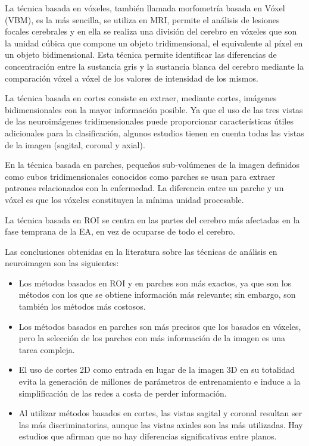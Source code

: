 La técnica basada en vóxeles, también llamada morfometría basada en Vóxel (VBM), es la más sencilla, se utiliza en MRI,
permite el análisis de lesiones focales cerebrales y en ella se realiza una división del cerebro en vóxeles que son la
unidad cúbica que compone un objeto tridimensional, el equivalente al píxel en un objeto bidimensional.
Esta técnica permite identificar las diferencias de concentración entre la sustancia gris y la sustancia blanca del
cerebro mediante la comparación vóxel a vóxel de los valores de intensidad de los mismos.

La técnica basada en cortes consiste en extraer, mediante cortes, imágenes bidimensionales con la mayor información
posible.
Ya que el uso de las tres vistas de las neuroimágenes tridimensionales puede proporcionar características
útiles adicionales para la clasificación, algunos estudios tienen en cuenta todas las vistas de la imagen (sagital,
coronal y axial).

En la técnica basada en parches, pequeños sub-volúmenes de la imagen definidos como cubos tridimensionales conocidos
como parches se usan para extraer patrones relacionados con la enfermedad.
La diferencia entre un parche y un vóxel es que los vóxeles constituyen la mínima unidad procesable.

La técnica basada en ROI se centra en las partes del cerebro más afectadas en la fase temprana de la EA, en vez de
ocuparse de todo el cerebro.

Las conclusiones obtenidas en la literatura sobre las técnicas de análisis en neuroimagen son las siguientes:
\begin{itemize}
    \item Los métodos basados en ROI y en parches son más exactos, ya que son los métodos con los que se obtiene
    información más relevante;
    sin embargo, son también los métodos más costosos.
    \item Los métodos basados en parches son más precisos que los basados en vóxeles, pero la selección de los parches
    con más información de la imagen es una tarea compleja.
    \item El uso de cortes 2D como entrada en lugar de la imagen 3D en su totalidad evita la generación de millones de
    parámetros de entrenamiento e induce a la simplificación de las redes a costa de perder información.
    \item Al utilizar métodos basados en cortes, las vistas sagital y coronal resultan ser las más discriminatorias,
    aunque las vistas axiales son las más utilizadas.
    Hay estudios que afirman que no hay diferencias significativas entre planos.\\
\end{itemize}

